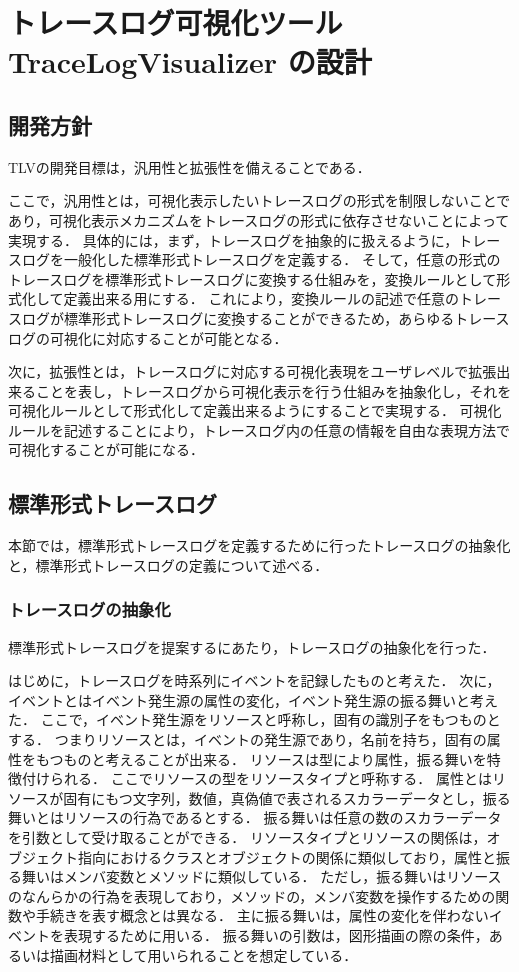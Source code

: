 \chapter{トレースログ可視化ツール TraceLogVisualizer の設計}

\section{開発方針}
TLVの開発目標は，汎用性と拡張性を備えることである．

ここで，汎用性とは，可視化表示したいトレースログの形式を制限しないことであり，可視化表示メカニズムをトレースログの形式に依存させないことによって実現する．
具体的には，まず，トレースログを抽象的に扱えるように，トレースログを一般化した標準形式トレースログを定義する．
そして，任意の形式のトレースログを標準形式トレースログに変換する仕組みを，変換ルールとして形式化して定義出来る用にする．
これにより，変換ルールの記述で任意のトレースログが標準形式トレースログに変換することができるため，あらゆるトレースログの可視化に対応することが可能となる．

次に，拡張性とは，トレースログに対応する可視化表現をユーザレベルで拡張出来ることを表し，トレースログから可視化表示を行う仕組みを抽象化し，それを可視化ルールとして形式化して定義出来るようにすることで実現する．
可視化ルールを記述することにより，トレースログ内の任意の情報を自由な表現方法で可視化することが可能になる．


\section{標準形式トレースログ}

本節では，標準形式トレースログを定義するために行ったトレースログの抽象化と，標準形式トレースログの定義について述べる．

\subsection{トレースログの抽象化}

標準形式トレースログを提案するにあたり，トレースログの抽象化を行った．

はじめに，トレースログを時系列にイベントを記録したものと考えた．
次に，イベントとはイベント発生源の属性の変化，イベント発生源の振る舞いと考えた．
ここで，イベント発生源をリソースと呼称し，固有の識別子をもつものとする．
つまりリソースとは，イベントの発生源であり，名前を持ち，固有の属性をもつものと考えることが出来る．
リソースは型により属性，振る舞いを特徴付けられる．
ここでリソースの型をリソースタイプと呼称する．
属性とはリソースが固有にもつ文字列，数値，真偽値で表されるスカラーデータとし，振る舞いとはリソースの行為であるとする．
振る舞いは任意の数のスカラーデータを引数として受け取ることができる．
リソースタイプとリソースの関係は，オブジェクト指向におけるクラスとオブジェクトの関係に類似しており，属性と振る舞いはメンバ変数とメソッドに類似している．
ただし，振る舞いはリソースのなんらかの行為を表現しており，メソッドの，メンバ変数を操作するための関数や手続きを表す概念とは異なる．
主に振る舞いは，属性の変化を伴わないイベントを表現するために用いる．
振る舞いの引数は，図形描画の際の条件，あるいは描画材料として用いられることを想定している．

